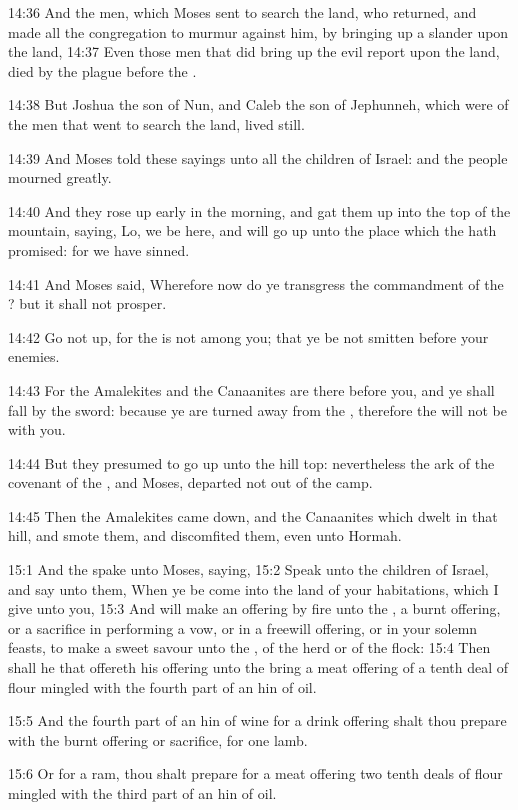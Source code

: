 14:36 And the men, which Moses sent to search the land, who returned, and made all the congregation to murmur against him, by bringing up a slander upon the land, 14:37 Even those men that did bring up the evil report upon the land, died by the plague before the \LORD.

14:38 But Joshua the son of Nun, and Caleb the son of Jephunneh, which were of the men that went to search the land, lived still.

14:39 And Moses told these sayings unto all the children of Israel: and the people mourned greatly.

14:40 And they rose up early in the morning, and gat them up into the top of the mountain, saying, Lo, we be here, and will go up unto the place which the \LORD hath promised: for we have sinned.

14:41 And Moses said, Wherefore now do ye transgress the commandment of the \LORD? but it shall not prosper.

14:42 Go not up, for the \LORD is not among you; that ye be not smitten before your enemies.

14:43 For the Amalekites and the Canaanites are there before you, and ye shall fall by the sword: because ye are turned away from the \LORD, therefore the \LORD will not be with you.

14:44 But they presumed to go up unto the hill top: nevertheless the ark of the covenant of the \LORD, and Moses, departed not out of the camp.

14:45 Then the Amalekites came down, and the Canaanites which dwelt in that hill, and smote them, and discomfited them, even unto Hormah.

15:1 And the \LORD spake unto Moses, saying, 15:2 Speak unto the children of Israel, and say unto them, When ye be come into the land of your habitations, which I give unto you, 15:3 And will make an offering by fire unto the \LORD, a burnt offering, or a sacrifice in performing a vow, or in a freewill offering, or in your solemn feasts, to make a sweet savour unto the \LORD, of the herd or of the flock: 15:4 Then shall he that offereth his offering unto the \LORD bring a meat offering of a tenth deal of flour mingled with the fourth part of an hin of oil.

15:5 And the fourth part of an hin of wine for a drink offering shalt thou prepare with the burnt offering or sacrifice, for one lamb.

15:6 Or for a ram, thou shalt prepare for a meat offering two tenth deals of flour mingled with the third part of an hin of oil.

